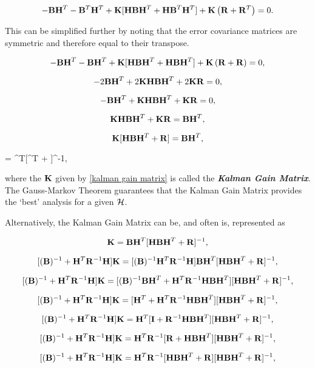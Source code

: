 $$
    -\mathbf{BH}^T - \mathbf{B}^T\mathbf{H}^T + \mathbf{K}[\mathbf{HBH}^T + \mathbf{HB}^T\mathbf{H}^T] + \mathbf{K}\left(\mathbf{R} + \mathbf{R}^T\right)= 0.
$$


\noindent This can be simplified further by noting that the error covariance matrices are symmetric and therefore equal to their transpose.


$$
    -\mathbf{BH}^T - \mathbf{BH}^T + \mathbf{K}[\mathbf{HBH}^T + \mathbf{HBH}^T] + \mathbf{K}\left(\mathbf{R} + \mathbf{R}\right)=0,
$$


$$
    -2\mathbf{BH}^T + 2\mathbf{KHBH}^T + 2\mathbf{KR} = 0,
$$


$$
    -\mathbf{BH}^T + \mathbf{KHBH}^T + \mathbf{KR} = 0,
$$


$$
    \mathbf{KHBH}^T + \mathbf{KR} = \mathbf{BH}^T,
$$


$$
    \mathbf{K}[\mathbf{HBH}^T + \mathbf{R}] = \mathbf{BH}^T,
$$


\be
    \label{kalman gain matrix}
     = ^T[^T + ]^{-1},
\ee


\noindent where the $\mathbf{K}$ given by \ref{kalman gain matrix} is called the \emph{\textbf{Kalman Gain Matrix}}. The Gauss-Markov Theorem guarantees that the Kalman Gain Matrix provides the `best' analysis for a given $\mathcal{H}$.


Alternatively, the Kalman Gain Matrix can be, and often is, represented as


$$
    \mathbf{K} = \mathbf{BH}^T[\mathbf{HBH}^T + \mathbf{R}]^{-1},
$$


$$
    [(\mathbf{B})^{-1} + \mathbf{H}^T\mathbf{R}^{-1}\mathbf{H}]\mathbf{K} = [(\mathbf{B})^{-1}\mathbf{H}^T\mathbf{R}^{-1}\mathbf{H}]\mathbf{BH}^T[\mathbf{HBH}^T + \mathbf{R}]^{-1},
$$


$$
    [(\mathbf{B})^{-1} + \mathbf{H}^T\mathbf{R}^{-1}\mathbf{H}]\mathbf{K} = [(\mathbf{B})^{-1}\mathbf{BH}^T + \mathbf{H}^T\mathbf{R}^{-1}\mathbf{H}\mathbf{BH}^T][\mathbf{HBH}^T + \mathbf{R}]^{-1},
$$


$$
    [(\mathbf{B})^{-1} + \mathbf{H}^T\mathbf{R}^{-1}\mathbf{H}]\mathbf{K} = [\mathbf{H}^T + \mathbf{H}^T\mathbf{R}^{-1}\mathbf{H}\mathbf{BH}^T][\mathbf{HBH}^T + \mathbf{R}]^{-1},
$$


$$
    [(\mathbf{B})^{-1} + \mathbf{H}^T\mathbf{R}^{-1}\mathbf{H}]\mathbf{K} = \mathbf{H}^T[\mathbf{I} + \mathbf{R}^{-1}\mathbf{H}\mathbf{BH}^T][\mathbf{HBH}^T + \mathbf{R}]^{-1},
$$


$$
    [(\mathbf{B})^{-1} + \mathbf{H}^T\mathbf{R}^{-1}\mathbf{H}]\mathbf{K} = \mathbf{H}^T\mathbf{R}^{-1}[\mathbf{R} + \mathbf{H}\mathbf{BH}^T][\mathbf{HBH}^T + \mathbf{R}]^{-1},
$$


$$
    [(\mathbf{B})^{-1} + \mathbf{H}^T\mathbf{R}^{-1}\mathbf{H}]\mathbf{K} = \mathbf{H}^T\mathbf{R}^{-1}[\mathbf{H}\mathbf{BH}^T + \mathbf{R}][\mathbf{HBH}^T + \mathbf{R}]^{-1},
$$


